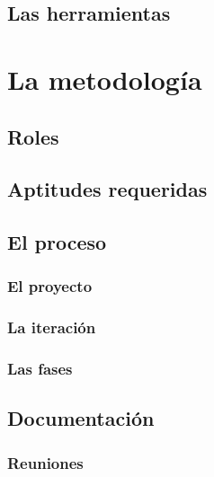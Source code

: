 \documentclass{iccmemoria}
\begin{document}
		\subsection{Las herramientas}
		
	
	\section{La metodología}
	
		\subsection{Roles}
		\label{sec:Roles}
		

		\subsection{Aptitudes requeridas}
		

		\subsection{El proceso}
		

			\subsubsection{El proyecto}
			

			\subsubsection{La iteración}
			

			\subsubsection{Las fases}
			

		\subsection{Documentación}
		

			\subsubsection{Reuniones}
			
\end{document}
